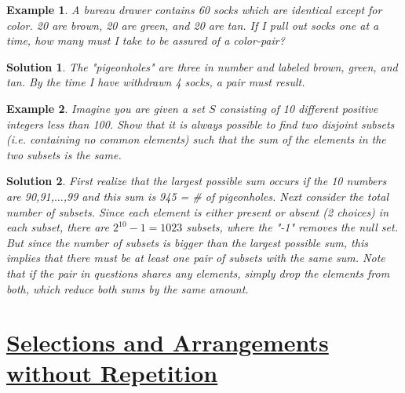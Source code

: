 \documentclass[12pt, letterpaper, onecolumn, conference, final]{IEEEtran}
\theoremstyle{definition}
\newtheorem{definition}{Definition}[section]
\theoremstyle{plain}
\newtheorem{example}{Example}[section]
\newtheorem{solution}{Solution}[section]
\begin{document}
\begin{example}
A bureau drawer contains 60 socks which are identical except for color. 20 are brown, 20 are green, and 20 are tan. If I pull out socks one at a time, how many must I take to be assured of a color-pair?
\end{example}
\begin{solution}
The "pigeonholes" are three in number and labeled brown, green, and tan. By the time I have withdrawn 4 socks, a pair must result.
\end{solution}

\begin{example}
Imagine you are given a set $S$ consisting of 10 different positive integers less than 100. Show that it is always possible to find two disjoint subsets (i.e. containing no common elements) such that the sum of the elements in the two subsets is the same.
\end{example}
\begin{solution}
First realize that the largest possible sum occurs if the 10 numbers are 90,91,$\dots$,99 and this sum is 945 = \# of pigeonholes. Next consider the total number of subsets. Since each element is either present or absent (2 choices) in each subset, there are $2^{10} - 1 = 1023$ subsets, where the "-1" removes the null set. But since the number of subsets is bigger than the largest possible sum, this implies that there must be at least one pair of subsets with the same sum. Note that if the pair in questions shares any elements, simply drop the elements from both, which reduce both sums by the same amount.
\end{solution}

\newpage
\section{\textbf{\underline{Selections and Arrangements without Repetition}}}
\vspace{.3cm}
\begin{center}
\end{center}
\end{document}
